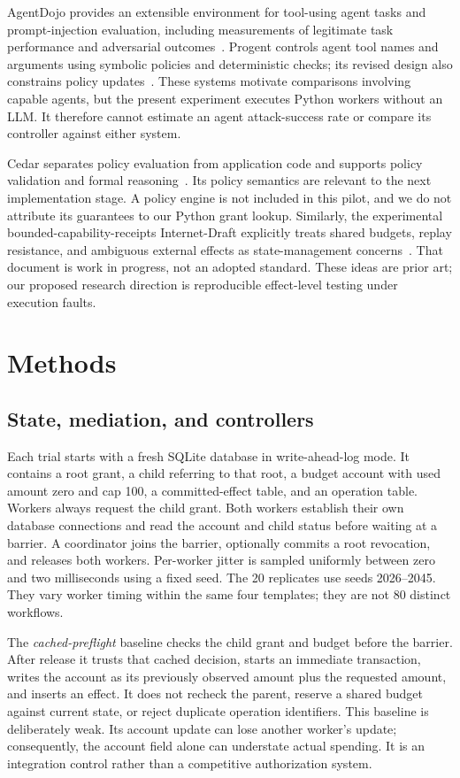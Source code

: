 \documentclass[manuscript,screen,nonacm]{acmart}
\begin{document}
AgentDojo provides an extensible environment for tool-using agent tasks and prompt-injection evaluation, including measurements of legitimate task performance and adversarial outcomes~\cite{debenedetti2024agentdojo}. Progent controls agent tool names and arguments using symbolic policies and deterministic checks; its revised design also constrains policy updates~\cite{shi2025progent}. These systems motivate comparisons involving capable agents, but the present experiment executes Python workers without an LLM. It therefore cannot estimate an agent attack-success rate or compare its controller against either system.

Cedar separates policy evaluation from application code and supports policy validation and formal reasoning~\cite{cutler2024cedar}. Its policy semantics are relevant to the next implementation stage. A policy engine is not included in this pilot, and we do not attribute its guarantees to our Python grant lookup. Similarly, the experimental bounded-capability-receipts Internet-Draft explicitly treats shared budgets, replay resistance, and ambiguous external effects as state-management concerns~\cite{schrock2026bounded}. That document is work in progress, not an adopted standard. These ideas are prior art; our proposed research direction is reproducible effect-level testing under execution faults.

\section{Methods}
\subsection{State, mediation, and controllers}
Each trial starts with a fresh SQLite database in write-ahead-log mode. It contains a root grant, a child referring to that root, a budget account with used amount zero and cap 100, a committed-effect table, and an operation table. Workers always request the child grant. Both workers establish their own database connections and read the account and child status before waiting at a barrier. A coordinator joins the barrier, optionally commits a root revocation, and releases both workers. Per-worker jitter is sampled uniformly between zero and two milliseconds using a fixed seed. The 20 replicates use seeds 2026--2045. They vary worker timing within the same four templates; they are not 80 distinct workflows.

The \emph{cached-preflight} baseline checks the child grant and budget before the barrier. After release it trusts that cached decision, starts an immediate transaction, writes the account as its previously observed amount plus the requested amount, and inserts an effect. It does not recheck the parent, reserve a shared budget against current state, or reject duplicate operation identifiers. This baseline is deliberately weak. Its account update can lose another worker's update; consequently, the account field alone can understate actual spending. It is an integration control rather than a competitive authorization system.
\end{document}
